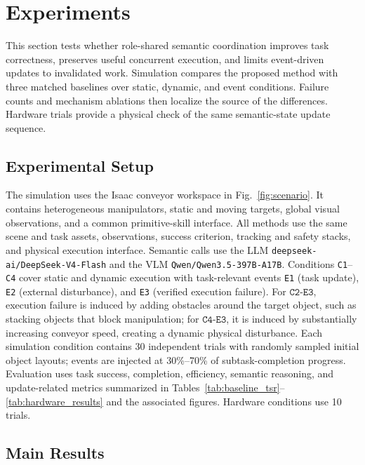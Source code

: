 \providecommand{\expplaceholder}{\textbf{***}}

\section{Experiments}
\label{sec:experiments}

This section tests whether role-shared semantic coordination improves task
correctness, preserves useful concurrent execution, and limits event-driven
updates to invalidated work. Simulation compares the proposed method with
three matched baselines over static, dynamic, and event conditions. Failure
counts and mechanism ablations then localize the source of the differences.
Hardware trials provide a physical check of the same semantic-state update
sequence.



\subsection{Experimental Setup}
\label{sec:experiment_setup}

The simulation uses the Isaac conveyor workspace in Fig.~\ref{fig:scenario}.
It contains heterogeneous manipulators, static and moving targets, global
visual observations, and a common primitive-skill interface. All methods use
the same scene and task assets, observations, success criterion, tracking and
safety stacks, and physical execution interface. Semantic calls use the LLM
\texttt{deepseek-ai/DeepSeek-V4-Flash} and the VLM
\texttt{Qwen/Qwen3.5-397B-A17B}. Conditions \texttt{C1}--\texttt{C4} cover
static and dynamic execution with task-relevant events \texttt{E1} (task
update), \texttt{E2} (external disturbance), and \texttt{E3} (verified
execution failure).
For $\texttt{C2-E3}$, execution failure is induced by adding obstacles around
the target object, such as stacking objects that block manipulation; for
$\texttt{C4-E3}$, it is induced by substantially increasing conveyor speed,
creating a dynamic physical disturbance.
Each simulation condition contains 30 independent trials with randomly sampled
initial object layouts; events are injected at 30\%--70\% of subtask-completion
progress.
Evaluation uses task success, completion, efficiency, semantic reasoning, and
update-related metrics summarized in Tables~\ref{tab:baseline_tsr}--\ref{tab:hardware_results}
and the associated figures. Hardware conditions use 10 trials.

\subsection{Main Results}
\label{sec:main_results}

